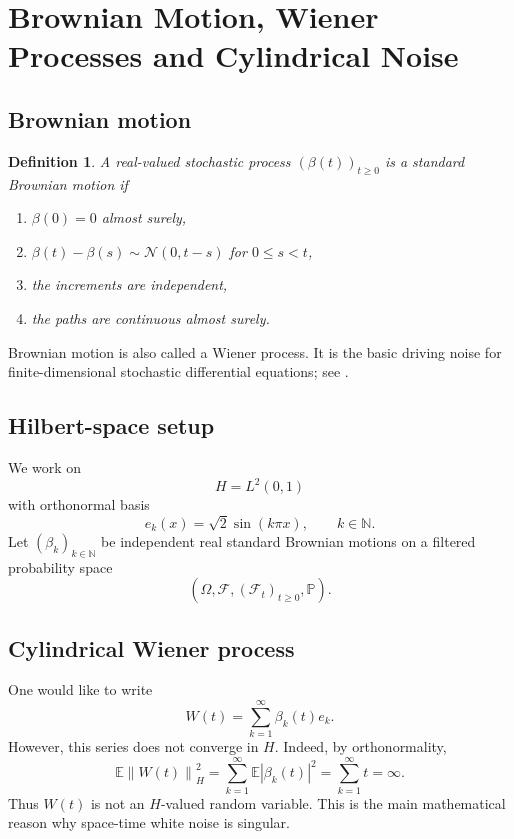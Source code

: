 \documentclass[11pt,a4paper]{article}
\newtheorem{definition}[theorem]{Definition}
\newcommand{\N}{\mathbb{N}}
\newcommand{\E}{\mathbb{E}}
\newcommand{\Prob}{\mathbb{P}}
\newcommand{\norm}[1]{\left\lVert #1 \right\rVert}
\begin{document}
\section{Brownian Motion, Wiener Processes and Cylindrical Noise}

\subsection{Brownian motion}

\begin{definition}
A real-valued stochastic process \((\beta(t))_{t\ge0}\) is a standard Brownian
motion if
\begin{enumerate}
  \item \(\beta(0)=0\) almost surely,
  \item \(\beta(t)-\beta(s)\sim\mathcal N(0,t-s)\) for \(0\le s<t\),
  \item the increments are independent,
  \item the paths are continuous almost surely.
\end{enumerate}
\end{definition}

Brownian motion is also called a Wiener process. It is the basic driving noise
for finite-dimensional stochastic differential equations; see
\cite{delSarto2025}.

\subsection{Hilbert-space setup}

We work on
\[
  H=L^2(0,1)
\]
with orthonormal basis
\[
  e_k(x)=\sqrt{2}\sin(k\pi x),
  \qquad k\in\N.
\]
Let \((\beta_k)_{k\in\N}\) be independent real standard Brownian motions on a
filtered probability space
\[
  (\Omega,\mathcal F,(\mathcal F_t)_{t\ge0},\Prob).
\]

\subsection{Cylindrical Wiener process}

One would like to write
\[
  W(t)=\sum_{k=1}^{\infty}\beta_k(t)e_k.
\]
However, this series does not converge in \(H\). Indeed, by orthonormality,
\[
  \E\norm{W(t)}_H^2
  =
  \sum_{k=1}^{\infty}\E|\beta_k(t)|^2
  =
  \sum_{k=1}^{\infty} t
  =
  \infty.
\]
Thus \(W(t)\) is not an \(H\)-valued random variable. This is the main
mathematical reason why space-time white noise is singular.
\end{document}

